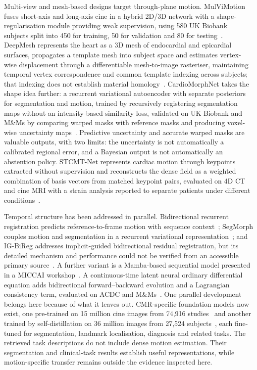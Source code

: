 Multi-view and mesh-based designs target through-plane motion. MulViMotion fuses short-axis and long-axis cine in a hybrid 2D/3D network with a shape-regularisation module providing weak supervision, using 580 UK Biobank subjects split into 450 for training, 50 for validation and 80 for testing~\cite{meng2022mulvimotion}. DeepMesh represents the heart as a 3D mesh of endocardial and epicardial surfaces, propagates a template mesh into subject space and estimates vertex-wise displacement through a differentiable mesh-to-image rasteriser, maintaining temporal vertex correspondence and common template indexing across subjects; that indexing does not establish material homology~\cite{meng2024deepmesh}. CardioMorphNet takes the shape idea further: a recurrent variational autoencoder with separate posteriors for segmentation and motion, trained by recursively registering segmentation maps without an intensity-based similarity loss, validated on UK Biobank and M\&Ms by comparing warped masks with reference masks and producing voxel-wise uncertainty maps~\cite{movahed2026cardiomorphnet}. Predictive uncertainty and accurate warped masks are valuable outputs, with two limits: the uncertainty is not automatically a calibrated regional error, and a Bayesian output is not automatically an abstention policy. STCMT-Net represents cardiac motion through keypoints extracted without supervision and reconstructs the dense field as a weighted combination of basis vectors from matched keypoint pairs, evaluated on 4D CT and cine MRI with a strain analysis reported to separate patients under different conditions~\cite{qiao2026stcmt}.

Temporal structure has been addressed in parallel. Bidirectional recurrent registration predicts reference-to-frame motion with sequence context~\cite{lu2023bireg}; SegMorph couples motion and segmentation in a recurrent variational representation~\cite{bi2025segmorph}; and IG-BiReg addresses implicit-guided bidirectional residual registration, but its detailed mechanism and performance could not be verified from an accessible primary source~\cite{jia2026igbireg}. A further variant is a Mamba-based sequential model presented in a MICCAI workshop~\cite{yin2025mcm}. A continuous-time latent neural ordinary differential equation adds bidirectional forward--backward evolution and a Lagrangian consistency term, evaluated on ACDC and M\&Ms~\cite{ruan2026latentode}. One parallel development belongs here because of what it leaves out. CMR-specific foundation models now exist, one pre-trained on 15 million cine images from 74,916 studies~\cite{fu2026cinema} and another trained by self-distillation on 36 million images from 27,524 subjects~\cite{jacob2025cmrfm}, each fine-tuned for segmentation, landmark localisation, diagnosis and related tasks. The retrieved task descriptions do not include dense motion estimation. Their segmentation and clinical-task results establish useful representations, while motion-specific transfer remains outside the evidence inspected here.

